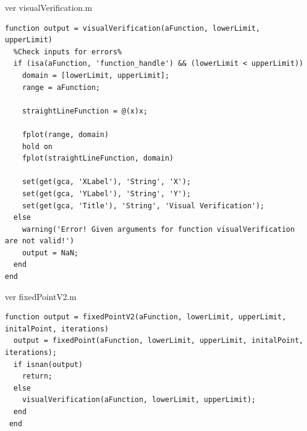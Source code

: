 \documentclass[spanish,notitlepage,letterpaper, 10pt]{article} %
\begin{document}
ver visualVerification.m
\begin{lstlisting}
function output = visualVerification(aFunction, lowerLimit, upperLimit)
  %Check inputs for errors%
  if (isa(aFunction, 'function_handle') && (lowerLimit < upperLimit))
    domain = [lowerLimit, upperLimit];
    range = aFunction;

    straightLineFunction = @(x)x;

    fplot(range, domain)
    hold on
    fplot(straightLineFunction, domain)

    set(get(gca, 'XLabel'), 'String', 'X');
    set(get(gca, 'YLabel'), 'String', 'Y');
    set(get(gca, 'Title'), 'String', 'Visual Verification');
  else 
    warning('Error! Given arguments for function visualVerification are not valid!')
    output = NaN;
  end
end
\end{lstlisting}

ver fixedPointV2.m
\begin{lstlisting}
function output = fixedPointV2(aFunction, lowerLimit, upperLimit, initalPoint, iterations)
  output = fixedPoint(aFunction, lowerLimit, upperLimit, initalPoint, iterations);
  if isnan(output)
    return;
  else
    visualVerification(aFunction, lowerLimit, upperLimit);
  end
 end
\end{lstlisting}

\newpage


\end{document}
